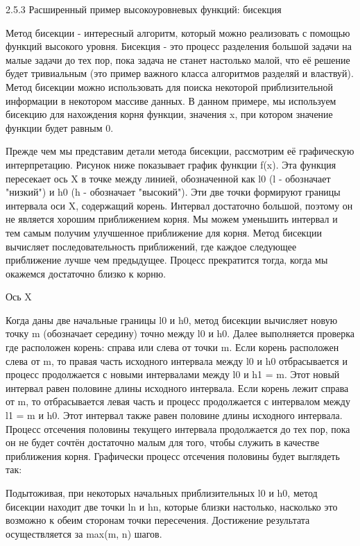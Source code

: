 2.5.3 Расширенный пример высокоуровневых функций: бисекция

Метод бисекции - интересный алгоритм, который можно реализовать с помощью функций высокого уровня. Бисекция - это процесс разделения большой задачи на малые задачи до тех пор, пока задача не станет настолько малой, что её решение будет тривиальным (это пример важного класса алгоритмов разделяй и властвуй). Метод бисекции можно использовать для поиска некоторой приблизительной информации в некотором массиве данных. В данном примере, мы используем бисекцию для нахождения корня функции, значения x, при котором значение функции будет равным 0.

Прежде чем мы представим детали метода бисекции, рассмотрим её графическую интерпретацию. Рисунок ниже показывает график функции f(x). Эта функция пересекает ось X в точке между линией, обозначенной как l0 (l - обозначает "низкий") и h0 (h - обозначает "высокий"). Эти две точки формируют границы интервала оси X, содержащий корень. Интервал достаточно большой, поэтому он не является хорошим приближением корня. Мы можем уменьшить интервал и тем самым получим улучшенное приближение для корня. Метод бисекции вычисляет последовательность приближений, где каждое следующее приближение лучше чем предыдущее. Процесс прекратится тогда, когда мы окажемся достаточно близко к корню.

Ось X

Когда даны две начальные границы l0 и h0, метод бисекции вычисляет новую точку m (обозначает середину) точно между l0 и h0. Далее выполняется проверка где расположен корень: справа или слева от точки m. Если корень расположен слева от m, то правая часть исходного интервала между l0 и h0 отбрасывается и процесс продолжается с новыми интервалами между l0 и h1 = m. Этот новый интервал равен половине длины исходного интервала. Если корень лежит справа от m, то отбрасывается левая часть и процесс продолжается с интервалом между l1 = m и h0. Этот интервал также равен половине длины исходного интервала. Процесс отсечения половины текущего интервала продолжается до тех пор, пока он не будет сочтён достаточно малым для того, чтобы служить в качестве приближения корня. Графически процесс отсечения половины будет выглядеть так:

Подытоживая, при некоторых начальных приблизительных l0 и h0, метод бисекции находит две точки ln и hn, которые близки настолько, насколько это возможно к обеим сторонам точки пересечения. Достижение результата осуществляется за max(m, n) шагов.

